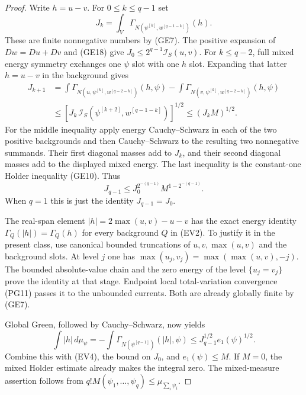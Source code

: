 \begin{proof}
Write $h=u-v$. For $0\leq k\leq q-1$ set
\[
 J_k=\int_V\Gamma_{N(\psi^{[k]},w^{[q-1-k]})}(h).
 \tag{EV2}
\]
These are finite nonnegative numbers by (GE7). The positive
expansion of $Dw=Du+Dv$ and (GE18) give
$J_0\leq2^{q-1}\mathscr I_S(u,v)$.
For $k\leq q-2$, full mixed energy symmetry exchanges one
$\psi$ slot with one $h$ slot. Expanding that latter
$h=u-v$ in the background gives
\[
 \begin{split}
 J_{k+1}
 &=\int\Gamma_{N(u,\psi^{[k]},w^{[q-2-k]})}(h,\psi)
   -\int\Gamma_{N(v,\psi^{[k]},w^{[q-2-k]})}(h,\psi)\\
 &\leq\left[J_k\,
       \mathcal I_S(\psi^{[k+2]},w^{[q-1-k]})\right]^{1/2}
 \leq(J_kM)^{1/2}.
 \end{split}
 \tag{EV3}
\]
For the middle inequality apply energy Cauchy--Schwarz in
each of the two positive backgrounds and then Cauchy--Schwarz
to the resulting two nonnegative summands. Their first
diagonal masses add to $J_k$, and their second diagonal
masses add to the displayed mixed energy. The last inequality
is the constant-one Holder inequality (GE10). Thus
\[
 J_{q-1}\leq J_0^{2^{-(q-1)}}M^{1-2^{-(q-1)}}.
 \tag{EV4}
\]
When $q=1$ this is just the identity $J_{q-1}=J_0$.

The real-span element
$|h|=2\max(u,v)-u-v$ has the exact energy identity
$\Gamma_Q(|h|)=\Gamma_Q(h)$ for every background $Q$
in (EV2). To justify it in the present class, use canonical
bounded truncations of $u,v,\max(u,v)$ and the background
slots. At level $j$ one has
$\max(u_j,v_j)=\max(\max(u,v),-j)$.
The bounded absolute-value chain and the zero energy of
the level $\{u_j=v_j\}$ prove the identity at that stage.
Endpoint local total-variation convergence (PG11) passes
it to the unbounded currents. Both are already globally
finite by (GE7).

Global Green, followed by Cauchy--Schwarz, now yields
\[
 \int|h|\,d\mu_\psi
  =-\int\Gamma_{N(\psi^{[q-1]})}(|h|,\psi)
       \leq J_{q-1}^{1/2}e_1(\psi)^{1/2}.
 \tag{EV5}
\]
Combine this with (EV4), the bound on $J_0$, and
$e_1(\psi)\leq M$. If $M=0$, the mixed Holder estimate
already makes the integral zero. The mixed-measure
assertion follows from
$q!M(\psi_1,\ldots,\psi_q)\leq\mu_{\sum_i\psi_i}$.
\end{proof}



